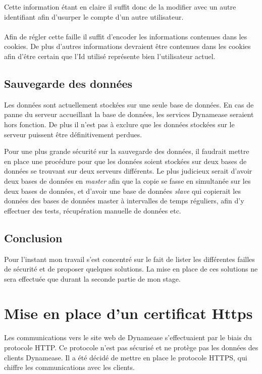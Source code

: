 Cette information étant en claire il suffit donc de la modifier avec un autre identifiant afin d'usurper le compte d'un autre utilisateur.
\\\\

Afin de régler cette faille il suffit d'encoder les informations contenues dans les cookies. De plus d'autres informations devraient être contenues dans les cookies afin d'être certain que l'Id utilisé représente bien l'utilisateur actuel.

\subsection{Sauvegarde des données}

Les données sont actuellement stockées sur une seule base de données. En cas de panne du serveur accueillant la base de données, les services Dynamease seraient hors fonction. De plus il n'est pas à exclure que les données stockées sur le serveur puissent être définitivement perdues.

Pour une plus grande sécurité sur la sauvegarde des données, il faudrait mettre en place une procédure pour que les données soient stockées sur deux bases de données se trouvant sur deux serveurs différents. Le plus judicieux serait d'avoir deux bases de données en \textit{master} afin que la copie se fasse en simultanée sur les deux bases de données, et d'avoir une base de données \textit{slave} qui copierait les données des bases de données master à intervalles de temps réguliers, afin d'y effectuer des tests, récupération manuelle de données etc.

\subsection{Conclusion}

Pour l'instant mon travail s'est concentré sur le fait de lister les différentes failles de sécurité et de proposer quelques solutions. La mise en place de ces solutions ne sera effectuée que durant la seconde partie de mon stage.

\section{Mise en place d'un certificat Https}

Les communications vers le site web de Dynamease s'effectuaient par le biais du protocole HTTP. Ce protocole n'est pas sécurisé et ne protège pas les données des clients Dynamease. Il a été décidé de mettre en place le protocole HTTPS, qui chiffre les communications avec les clients.

